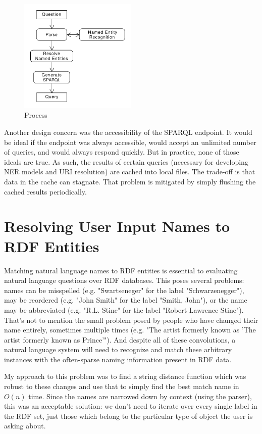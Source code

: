 \documentclass[11pt]{article}
\begin{document}
\begin{figure}[h!]
    \centering
    \includegraphics[width=0.5\textwidth,natwidth=1,natheight=1]{umlet/usage.pdf}
    \caption{Process}
    \label{fig:process}
\end{figure}

Another design concern was the accessibility of the SPARQL endpoint.
It would be ideal if the endpoint was always accessible, would accept an unlimited
number of queries, and would always respond quickly. But in practice, none of
those ideals are true. As such, the results of certain queries
(necessary for developing NER models and URI resolution) are cached into local files.
The trade-off is that data in the cache can stagnate. That problem is mitigated by 
simply flushing the cached results periodically.


\section{Resolving User Input Names to RDF Entities}

Matching natural language names to RDF entities is essential to evaluating
natural language questions over RDF databases. This poses several problems:
names can be misspelled (e.g. "Swartseneger" for the label "Schwarzenegger"), 
may be reordered (e.g. "John Smith" for the label "Smith, John"),
or the name may be abbreviated (e.g. "R.L. Stine" for the label "Robert Lawrence Stine").
That's not to mention the small problem posed by people who have
changed their name entirely, sometimes multiple times
(e.g. "The artist formerly known as 'The artist formerly known as Prince'").
And despite all of these convolutions, a natural language system will need to
recognize and match these arbitrary instances with the often-sparse naming information
present in RDF data.

My approach to this problem was to find a string distance function which was
robust to these changes and use that to simply
find the best match name in $O(n)$ time. Since the names are narrowed down by
context (using the parser), this was an acceptable solution: we don't need to iterate
over every single label in the RDF set, just those which belong to the particular
type of object the user is asking about.
\end{document}
